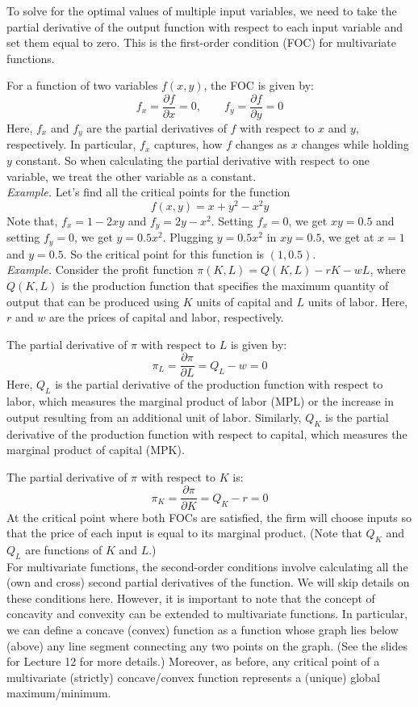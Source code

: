 \documentclass{./../Latex/handout}
\begin{document}
To solve for the optimal values of multiple input variables, we need to take the partial derivative of the output function with respect to each input variable and set them equal to zero. This is the first-order condition (FOC) for multivariate functions. 

 For a function of two variables $f(x,y)$, the FOC is given by:
$$ f_x = \frac{\partial f}{\partial x} = 0 , \quad \quad f_y = \frac{\partial f}{\partial y} = 0 $$
Here, $f_x$ and $f_y$ are the partial derivatives of $f$ with respect to $x$ and $y$, respectively. In particular, $f_x$ captures, how $f$ changes as $x$ changes while holding $y$ constant. So when calculating the partial derivative with respect to one variable, we treat the other variable as a constant. \\

\textit{Example.} Let's find all the critical points for the function $$f(x,y) = x + y^2- x^2y$$ 
Note that, $f_x=1-2xy$ and $f_y = 2y-x^2$. 
Setting $f_x=0$, we get $xy=0.5$ and setting $f_y=0$, we get $y=0.5x^2$. 
Plugging $y=0.5x^2$ in  $xy=0.5$, we get at $x=1$ and $y=0.5$. So the critical point for this function is $(1,0.5)$. \\

\textit{Example.}  Consider the profit function $\pi(K,L) = Q(K,L) - rK - wL$, where $Q(K,L)$ is the production function that specifies the maximum quantity of output that can be produced using $K$ units of capital and $L$ units of labor. Here, $r$ and $w$ are the prices of capital and labor, respectively. 

The partial derivative of $\pi$ with respect to $L$ is given by:
 $$ \pi_L = \frac{\partial \pi}{\partial L}  = Q_L-w = 0   $$
Here, $Q_L$ is the partial derivative of the production function with respect to labor, which measures the marginal product of labor (MPL) or the increase in output resulting from an additional unit of labor. Similarly, $Q_K$ is the partial derivative of the production function with respect to capital, which measures the marginal product of capital (MPK). 

The partial derivative of $\pi$ with respect to $K$ is:
$$ \pi_K = \frac{\partial \pi}{\partial K}  = Q_K-r = 0   $$
At the critical point where both FOCs are satisfied, the firm will choose inputs so that the price of each input is equal to its marginal product. (Note that $Q_K$ and $Q_L$ are functions of $K$ and $L$.) \\

For multivariate functions, the second-order conditions involve calculating all the (own and cross) second partial derivatives of the function. We will skip details on these conditions here. However, it is important to note that the concept of concavity and convexity can be extended to multivariate functions. In particular, we can define a concave (convex) function as a function whose graph lies below (above) any line segment connecting any two points on the graph. (See the slides for Lecture 12 for more details.) Moreover, as before, any critical point of a multivariate (strictly) concave/convex function represents a (unique) global maximum/minimum. 
\end{document}
